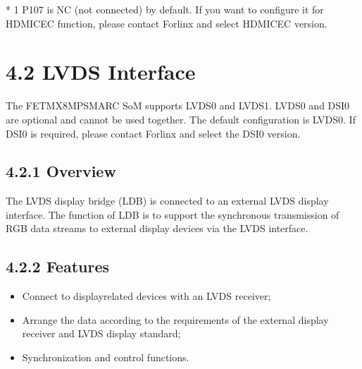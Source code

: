 \documentclass[letterpaper,10pt,openany,english]{sphinxmanual}
\begin{document}
\sphinxAtStartPar
* 1 P107 is NC (not connected) by default. If you want to configure it for HDMI\sphinxhyphen{}CEC function, please contact Forlinx and select HDMI\sphinxhyphen{}CEC version.


\section{4.2 LVDS Interface}
\label{\detokenize{hardware:lvds-interface}}
\sphinxAtStartPar
The FET\sphinxhyphen{}MX8MP\sphinxhyphen{}SMARC SoM supports LVDS0 and LVDS1. LVDS0 and DSI0 are optional and cannot be used together. The default configuration is LVDS0. If DSI0 is required, please contact Forlinx and select the DSI0 version.


\subsection{4.2.1 Overview}
\label{\detokenize{hardware:overview}}
\sphinxAtStartPar
The LVDS display bridge (LDB) is connected to an external LVDS display interface. The function of LDB is to support the synchronous transmission of RGB data streams to external display devices via the LVDS interface.


\subsection{4.2.2 Features}
\label{\detokenize{hardware:features}}\begin{itemize}
\item {} 
\sphinxAtStartPar
Connect to display\sphinxhyphen{}related devices with an LVDS receiver;

\item {} 
\sphinxAtStartPar
Arrange the data according to the requirements of the external display receiver and LVDS display standard;

\item {} 
\sphinxAtStartPar
Synchronization and control functions.

\end{itemize}
\end{document}
